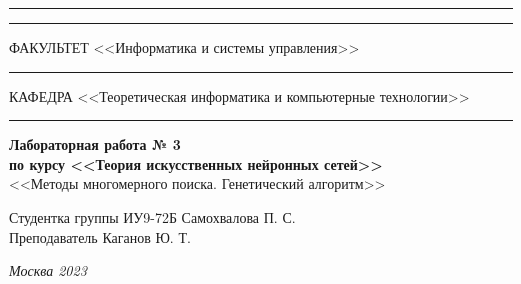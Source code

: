 \documentclass[a4paper, 14pt]{extarticle}
\begin{document}
\begin{titlepage}
\vspace{-25pt}
\hspace{-35pt}\rule{\textwidth}{2.3pt}

\vspace*{-20.3pt}
\hspace{-35pt}\rule{\textwidth}{0.4pt}

\vspace{1.5ex}
\hspace{-35pt} \noindent \small ФАКУЛЬТЕТ\hspace{80pt} <<Информатика и системы управления>>

\vspace*{-16pt}
\hspace{47pt}\rule{0.83\textwidth}{0.4pt}

\vspace{0.5ex}
\hspace{-35pt} \noindent \small КАФЕДРА\hspace{50pt} <<Теоретическая информатика и компьютерные технологии>>

\vspace*{-16pt}
\hspace{30pt}\rule{0.866\textwidth}{0.4pt}
  
\vspace{11em}

\begin{center}
\Large {\bf Лабораторная работа № 3} \\
\large {\bf по курсу <<Теория искусственных нейронных сетей>>} \\
\large <<Методы многомерного поиска. Генетический алгоритм>>
\end{center}\normalsize

\vspace{8em}


\begin{flushright}
  {Студентка группы ИУ9-72Б Самохвалова П. С. \hspace*{15pt}\\
  \vspace{2ex}
  Преподаватель Каганов Ю. Т.\hspace*{15pt}}
\end{flushright}

\bigskip

\vfill
 

\begin{center}
\textsl{Москва 2023}
\end{center}
\end{titlepage}
\end{document}
